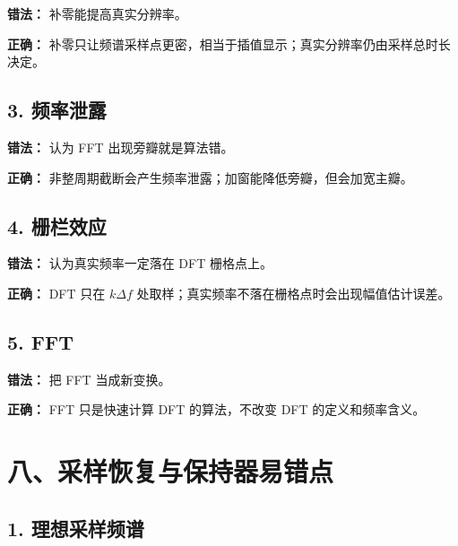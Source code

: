 \documentclass[11pt]{ctexart}
\begin{document}
\textbf{错法：} 补零能提高真实分辨率。\par



\textbf{正确：} 补零只让频谱采样点更密，相当于插值显示；真实分辨率仍由采样总时长决定。\par



\subsection*{3. 频率泄露}



\textbf{错法：} 认为 FFT 出现旁瓣就是算法错。\par



\textbf{正确：} 非整周期截断会产生频率泄露；加窗能降低旁瓣，但会加宽主瓣。\par



\subsection*{4. 栅栏效应}



\textbf{错法：} 认为真实频率一定落在 DFT 栅格点上。\par



\textbf{正确：} DFT 只在 \(k\Delta f\) 处取样；真实频率不落在栅格点时会出现幅值估计误差。\par



\subsection*{5. FFT}



\textbf{错法：} 把 FFT 当成新变换。\par



\textbf{正确：} FFT 只是快速计算 DFT 的算法，不改变 DFT 的定义和频率含义。\par



\section*{八、采样恢复与保持器易错点}



\subsection*{1. 理想采样频谱}
\end{document}
